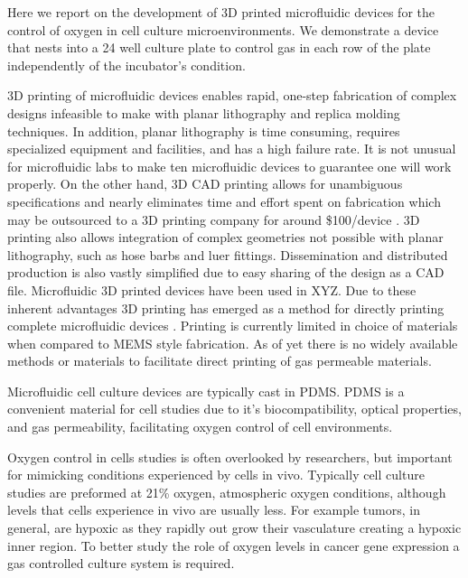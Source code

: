 Here we report on the development of 3D printed microfluidic devices for the control of oxygen in cell culture microenvironments.
We demonstrate a device that nests into a 24 well culture plate to control gas in each row of the plate independently of the incubator's condition.

3D printing of microfluidic devices enables rapid, one-step fabrication of complex designs infeasible to make with planar lithography and replica molding techniques.
In addition, planar lithography is time consuming, requires specialized equipment and facilities, and has a high failure rate.
It is not unusual for microfluidic labs to make ten microfluidic devices to guarantee one will work properly.
On the other hand, 3D CAD printing allows for unambiguous specifications and nearly eliminates time and effort spent on fabrication which may be outsourced to a 3D printing company for around \$100/device \cite{Au2014,Chen2014}.
3D printing also allows integration of complex geometries not possible with planar lithography, such as hose barbs and luer fittings.
Dissemination and distributed production is also vastly simplified due to easy sharing of the design as a CAD file.
Microfluidic 3D printed devices have been used in XYZ.
Due to these inherent advantages 3D printing has emerged as a method for directly printing complete microfluidic devices \cite{Au2014, Chen2014, Shallan2014,Erkal2014,Kitson2014}. 
Printing is currently limited in choice of materials when compared to MEMS style fabrication. 
As of yet there is no widely available methods or materials to facilitate direct printing of gas permeable materials.

Microfluidic cell culture devices are typically cast in PDMS.
PDMS is a convenient material for cell studies due to it's biocompatibility, optical properties, and gas permeability, facilitating oxygen control of cell environments.

Oxygen control in cells studies is often overlooked by researchers, but important for mimicking conditions experienced by cells in vivo.
Typically cell culture studies are preformed at 21\% oxygen, atmospheric oxygen conditions, although levels that cells experience in vivo are usually less.
For example tumors, in general, are hypoxic as they rapidly out grow their vasculature creating a hypoxic inner region. 
To better study the role of oxygen levels in cancer gene expression a gas controlled culture system is required.


